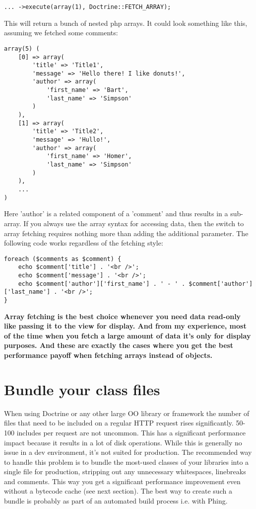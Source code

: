 \documentclass[11pt,a4paper]{report}
\begin{document}
\begin{verbatim}
... ->execute(array(1), Doctrine::FETCH_ARRAY);
\end{verbatim}

 This will return a bunch of nested php arrays. It could look something like this, assuming we fetched some comments:

\begin{verbatim}
array(5) (
    [0] => array(
        'title' => 'Title1',
        'message' => 'Hello there! I like donuts!',
        'author' => array(
            'first_name' => 'Bart',
            'last_name' => 'Simpson'
        )
    ),
    [1] => array(
        'title' => 'Title2',
        'message' => 'Hullo!',
        'author' => array(
            'first_name' => 'Homer',
            'last_name' => 'Simpson'
        )
    ),
    ...
)
\end{verbatim}

 Here 'author' is a related component of a 'comment' and thus results in a sub-array. If you always use the array syntax for accessing data, then the switch to array fetching requires nothing more than adding the additional parameter. The following code works regardless of the fetching style:

\begin{verbatim}
foreach ($comments as $comment) {
    echo $comment['title'] . '<br />';
    echo $comment['message'] . '<br />';
    echo $comment['author']['first_name'] . ' - ' . $comment['author']['last_name'] . '<br />';
}
\end{verbatim}

 \textbf{Array fetching is the best choice whenever you need data read-only like passing it to the view for display. And from my experience, most of the time when you fetch a large amount of data it's only for display purposes. And these are exactly the cases where you get the best performance payoff when fetching arrays instead of objects.}

\section{Bundle your class files}
When using Doctrine or any other large OO library or framework the number of files that need to be included on a regular HTTP request rises significantly. 50-100 includes per request are not uncommon. This has a significant performance impact because it results in a lot of disk operations. While this is generally no issue in a dev environment, it's not suited for production. The recommended way to handle this problem is to bundle the most-used classes of your libraries into a single file for production, stripping out any unnecessary whitespaces, linebreaks and comments. This way you get a significant performance improvement even without a bytecode cache (see next section). The best way to create such a bundle is probably as part of an automated build process i.e. with Phing.
\end{document}

